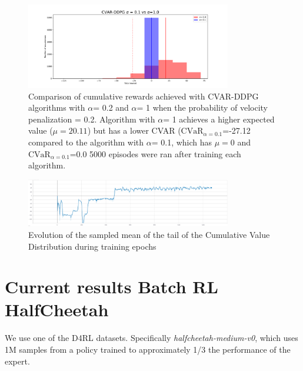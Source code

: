 \begin{figure}[ht]
        \centering
        \includegraphics[width=0.8\textwidth]{images/Car/histogram_rewards1vs01.pdf}
        \caption{Comparison of cumulative rewards achieved with CVAR-DDPG  algorithms with $\alpha$= 0.2
        and $\alpha$= 1 when the probability of velocity penalization = 0.2.
        Algorithm with $\alpha$= 1 achieves a higher expected value ($\mu=20.11$) but 
        has a lower CVAR ($\text{CVaR}_{\alpha= 0.1}$=-27.12 compared to the algorithm
        with $\alpha$= 0.1, which has $\mu=0$ and $\text{CVaR}_{\alpha= 0.1}$=0.0
        5000 episodes were ran after training each algorithm. }
        \label{histogram_alpha01_vs_alpha1}
    
\end{figure}

\begin{figure}[ht]
        \centering
        \includegraphics[width=0.8\textwidth]{images/Car/CVAR/Cvar_evol.png}
        \caption{Evolution of the sampled mean of the tail of the Cumulative Value Distribution during training epochs}
        \label{tail_CDF_EVOL}
    
\end{figure}



\pagebreak


\section{Current results Batch RL HalfCheetah}
We use one of the D4RL datasets.
Specifically \textit{halfcheetah-medium-v0}, which uses 1M samples from a policy trained
to approximately 1/3 the performance of the expert.

